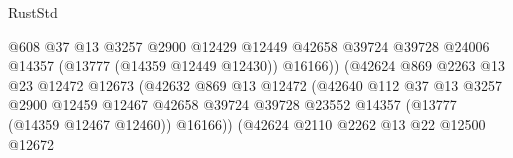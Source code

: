 \begin{lexlean}{RustStd}
\begin{coremodule}
                                                @608
                                                @37
                                                @13
                                                @3257
                                                @2900
                                                @12429
                                                @12449
                                                @42658
                                                @39724
                                                @39728
                                                @24006
                                                @14357
                                                (@13777 (@14359 @12449 @12430))
                                                @16166))
                                            (@42624
                                              @869
                                              @2263
                                              @13
                                              @23
                                              @12472
                                              @12673
                                              (@42632
                                                @869
                                                @13
                                                @12472
                                                (@42640
                                                  @112
                                                  @37
                                                  @13
                                                  @3257
                                                  @2900
                                                  @12459
                                                  @12467
                                                  @42658
                                                  @39724
                                                  @39728
                                                  @23552
                                                  @14357
                                                  (@13777 (@14359 @12467 @12460))
                                                  @16166))
                                              (@42624
                                                @2110
                                                @2262
                                                @13
                                                @22
                                                @12500
                                                @12672

\end{coremodule}
\end{lexlean}

